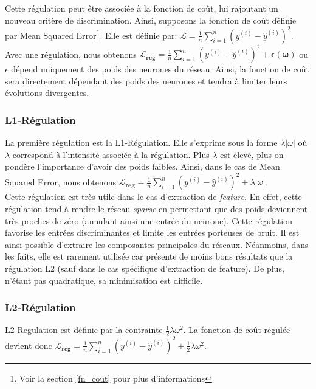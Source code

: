 \noindent Cette régulation peut être associée à la fonction de coût, lui rajoutant un nouveau critère de discrimination. Ainsi, supposons la fonction de coût définie par Mean Squared Error\footnote{Voir la section \ref{fn_cout} pour plus d'informations}. Elle est définie par: $\boldsymbol{\mathcal{L}}=\frac{1}{n}\sum_{i=1}^{n}(y^{(i)}-\hat{y}^{(i)})^{2}$. Avec une régulation, nous obtenons $\boldsymbol{\mathcal{L}_{reg}}=\frac{1}{n}\sum_{i=1}^{n}(y^{(i)}-\hat{y}^{(i)})^{2}+\boldsymbol{\epsilon(\omega)}$ ou $\epsilon$ dépend uniquement des poids des neurones du réseau. Ainsi, la fonction de coût sera directement dépendant des poids des neurones et tendra à limiter leurs évolutions divergentes.\\

\subsubsection{L1-Régulation}

La première régulation est la L1-Régulation. Elle s'exprime sous la forme $\lambda|\omega|$ où $\lambda$ correspond à l'intensité associée à la régulation. Plus $\lambda$ est élevé, plus on pondère l'importance d'avoir des poids faibles. Ainsi, dans le cas de Mean Squared Error, nous obtenons $\boldsymbol{\mathcal{L}_{reg}}=\frac{1}{n}\sum_{i=1}^{n}(y^{(i)}-\hat{y}^{(i)})^{2}+\lambda|\omega|$. \\

\noindent Cette régulation est très utile dans le cas d'extraction de \textit{feature}. En effet, cette régulation tend à rendre le réseau \textit{sparse} en permettant que des poids deviennent très proches de zéro (annulant ainsi une entrée du neurone). Cette régulation favorise les entrées discriminantes et limite les entrées porteuses de bruit. Il est ainsi possible d'extraire les composantes principales du réseaux. Néanmoins, dans les faits, elle est rarement utilisée car présente de moins bons résultats que la régulation L2 (sauf dans le cas spécifique d'extraction de feature). De plus, n'étant pas quadratique, sa minimisation est difficile.

\subsubsection{L2-Régulation}
\label{l2_reg}
L2-Regulation est définie par la contrainte $\frac{1}{2}\lambda\omega^2$. La fonction de coût régulée devient donc $\boldsymbol{\mathcal{L}_{reg}}=\frac{1}{n}\sum_{i=1}^{n}(y^{(i)}-\hat{y}^{(i)})^{2}+\frac{1}{2}\lambda\omega^2$.\\

